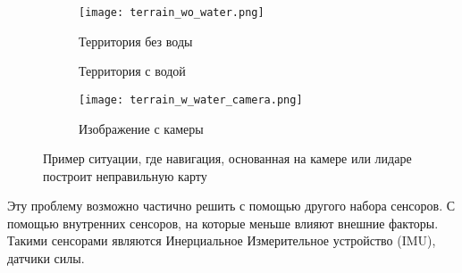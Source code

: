       \begin{figure}[h]
      \begin{subfigure}[t]{0.3\textwidth}
        \centering\texttt{[image: terrain\_wo\_water.png]}
        \caption{Территория без воды}
    \end{subfigure}
          \begin{subfigure}[t]{0.35\textwidth}
              \centering
              \caption{Территория с водой}
              \label{fig:terrain_w_water1.png}
          \end{subfigure}
          \begin{subfigure}[t]{0.3\textwidth}
              \centering\texttt{[image: terrain\_w\_water\_camera.png]}
              \caption{Изображение с камеры}
          \end{subfigure}
          \caption{Пример ситуации, где навигация, основанная на камере или лидаре построит неправильную карту}
          \label{fig:unsolvable_case}
      \end{figure}

Эту проблему возможно частично решить с помощью другого набора сенсоров. С помощью внутренних сенсоров, на которые меньше влияют внешние факторы. Такими сенсорами являются Инерциальное Измерительное устройство (IMU), датчики силы.

